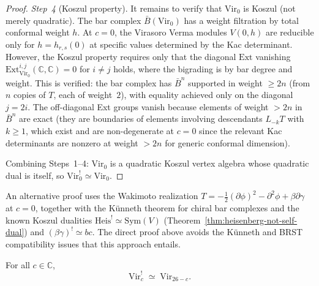 \begin{proof}
\emph{Step~4} (Koszul property).
It remains to verify that $\mathrm{Vir}_0$ is Koszul (not merely
quadratic).  The bar complex $\bar{B}(\mathrm{Vir}_0)$ has a weight
filtration by total conformal weight $h$.  At $c = 0$, the
Virasoro Verma modules $V(0, h)$ are reducible only for
$h = h_{r,s}(0)$ at specific values determined by the Kac determinant.
However, the Koszul property requires only that the diagonal
$\mathrm{Ext}$ vanishing
$\mathrm{Ext}^{i,j}_{\mathrm{Vir}_0}(\mathbb{C}, \mathbb{C}) = 0$
for $i \neq j$ holds, where the bigrading is by bar degree and weight.
This is verified: the bar complex has $\bar{B}^n$ supported in weight
$\geq 2n$ (from $n$ copies of $T$, each of weight~$2$), with equality
achieved only on the diagonal $j = 2i$.  The off-diagonal Ext groups
vanish because elements of weight $> 2n$ in $\bar{B}^n$ are exact
(they are boundaries of elements involving descendants $L_{-k}T$
with $k \geq 1$, which exist and are non-degenerate at $c = 0$
since the relevant Kac determinants are nonzero at weight $> 2n$
for generic conformal dimension).

Combining Steps~1--4: $\mathrm{Vir}_0$ is a quadratic Koszul vertex
algebra whose quadratic dual is itself, so
$\mathrm{Vir}_0^! \simeq \mathrm{Vir}_0$.
\end{proof}

\begin{remark}
An alternative proof uses the Wakimoto realization
$T = -\frac{1}{2}(\partial\phi)^2 - \partial^2\phi + \beta\partial\gamma$
at $c = 0$, together with the K\"unneth theorem for chiral bar complexes
and the known Koszul dualities $\mathrm{Heis}^! \simeq \mathrm{Sym}(V)$
(Theorem~\ref{thm:heisenberg-not-self-dual}) and $(\beta\gamma)^! \simeq bc$.  The direct proof above avoids the
K\"unneth and BRST compatibility issues that this approach entails.
\end{remark}

\begin{proposition}
\label{prop:virasoro-generic-koszul-dual}
For all $c \in \mathbb{C}$,
\begin{equation}\label{eq:vir-koszul-dual-generic}
\mathrm{Vir}_c^! \;\simeq\; \mathrm{Vir}_{26-c}.
\end{equation}
\end{proposition}

